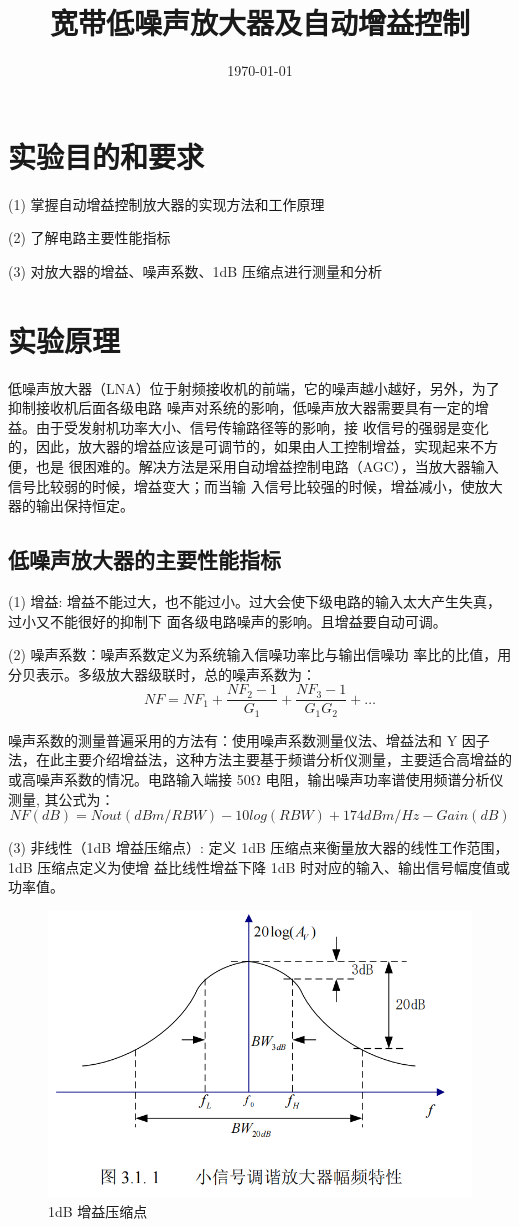 \documentclass{../source/Experiment}
\title{宽带低噪声放大器及自动增益控制}
\date{\today}
\begin{document}
\section{实验目的和要求}
 (1) 掌握自动增益控制放大器的实现方法和工作原理

(2) 了解电路主要性能指标

(3) 对放大器的增益、噪声系数、1dB 压缩点进行测量和分析

\section{实验原理}
低噪声放大器（LNA）位于射频接收机的前端，它的噪声越小越好，另外，为了抑制接收机后面各级电路
噪声对系统的影响，低噪声放大器需要具有一定的增益。由于受发射机功率大小、信号传输路径等的影响，接
收信号的强弱是变化的，因此，放大器的增益应该是可调节的，如果由人工控制增益，实现起来不方便，也是
很困难的。解决方法是采用自动增益控制电路（AGC），当放大器输入信号比较弱的时候，增益变大；而当输
入信号比较强的时候，增益减小，使放大器的输出保持恒定。

\subsection{低噪声放大器的主要性能指标}

(1) 增益: 增益不能过大，也不能过小。过大会使下级电路的输入太大产生失真，过小又不能很好的抑制下
面各级电路噪声的影响。且增益要自动可调。

(2) 噪声系数：噪声系数定义为系统输入信噪功率比与输出信噪功
率比的比值，用分贝表示。多级放大器级联时，总的噪声系数为：
$$NF = NF_1 + \frac{NF_2 -1}{G_1} + \frac{NF_3 - 1}{G_1G_2} + \dots $$

噪声系数的测量普遍采用的方法有：使用噪声系数测量仪法、增益法和 Y 因子法，在此主要介绍增益法，这种方法主要基于频谱分析仪测量，主要适合高增益的或高噪声系数的情况。电路输入端接 50Ω
电阻，输出噪声功率谱使用频谱分析仪测量, 其公式为：
$$NF(dB) = Nout(dBm/RBW) − 10 log(RBW) + 174dBm/Hz − Gain(dB)$$

(3) 非线性（1dB 增益压缩点）: 定义 1dB 压缩点来衡量放大器的线性工作范围，1dB 压缩点定义为使增
益比线性增益下降 1dB 时对应的输入、输出信号幅度值或功率值。


\begin{figure}[H]
    \centering
    \includegraphics[scale=0.4]{pic/fig1.png}
    \caption{1dB 增益压缩点}
\end{figure}
\end{document}
